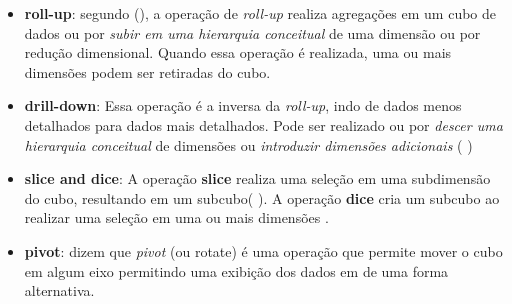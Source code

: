 \begin{itemize}
    \item \textbf{roll-up}: segundo \citeauthor{jmj} (\citeyear{jmj}), a operação de \textit{roll-up} realiza agregações em um cubo de dados ou por \textit{subir em uma hierarquia conceitual} de uma dimensão ou por redução dimensional. Quando essa operação é realizada, uma ou mais dimensões podem ser retiradas do cubo.
    
    \item \textbf{drill-down}: Essa operação é a inversa da \textit{roll-up}, indo de dados menos detalhados para dados mais detalhados. Pode ser realizado ou por \textit{descer uma hierarquia conceitual} de dimensões ou \textit{introduzir dimensões adicionais} (\citeauthor{jmj} \citeyear{jmj})
    
    \item \textbf{slice and dice}: A operação \textbf{slice} realiza uma seleção em uma subdimensão do cubo, resultando em um subcubo(\citeauthor{jmj} \citeyear{jmj}). A operação \textbf{dice} cria um subcubo ao realizar uma seleção em uma ou mais dimensões \citep{jmj}.
    
    \item \textbf{pivot}: \citeauthor{jmj} \citeyear{jmj} dizem que \textit{pivot} (ou rotate) é uma operação que permite mover o cubo em algum eixo permitindo uma exibição dos dados em de uma forma alternativa.
\end{itemize}
